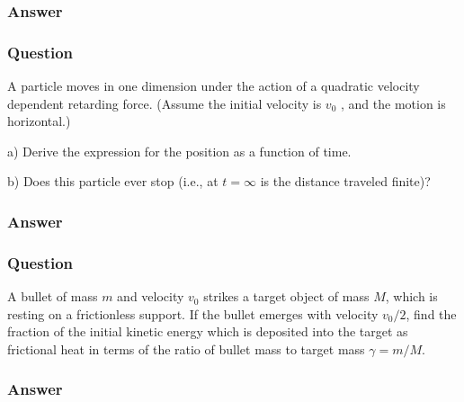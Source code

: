 \subsubsection{Answer}



\subsubsection{Question}
A particle moves in one dimension under the action of a quadratic velocity dependent retarding force. (Assume the initial velocity is $v_0$ , and the motion is horizontal.)

a) Derive the expression for the position as a function of time.

b) Does this particle ever stop (i.e., at $t = \infty$ is the distance traveled finite)?
\subsubsection{Answer}



\subsubsection{Question}
A bullet of mass $m$ and velocity $v_0$ strikes a target object of mass $M$, which is resting on a frictionless support. If the bullet emerges with velocity $v_0/2$, find the fraction of the initial kinetic energy which is deposited into the target as frictional heat in terms of the ratio of bullet mass to target mass $\gamma = m/M$.
\subsubsection{Answer}


